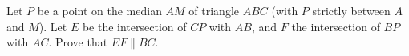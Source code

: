 Let $P$ be a point on the median $AM$ of triangle $ABC$ (with $P$ strictly between $A$ and $M$). Let $E$ be the intersection of $CP$ with $AB$, and $F$ the intersection of $BP$ with $AC$. Prove that $EF\parallel BC$.
